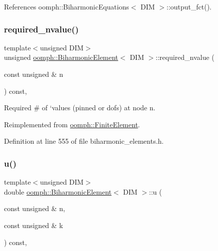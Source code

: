 References oomph\+::\+Biharmonic\+Equations$<$ D\+I\+M $>$\+::output\+\_\+fct().

\mbox{\label{classoomph_1_1BiharmonicElement_a11be94bc01db0e91409e5471693e8e0b}} 
\subsubsection{\texorpdfstring{required\+\_\+nvalue()}{required\_nvalue()}}
{\footnotesize\ttfamily template$<$unsigned D\+IM$>$ \\
unsigned \hyperlink{classoomph_1_1BiharmonicElement}{oomph\+::\+Biharmonic\+Element}$<$ D\+IM $>$\+::required\+\_\+nvalue (\begin{DoxyParamCaption}\item[{const unsigned \&}]{n }\end{DoxyParamCaption}) const\hspace{0.3cm}{\ttfamily [inline]}, {\ttfamily [virtual]}}



Required \# of `values\textquotesingle{} (pinned or dofs) at node n. 



Reimplemented from \hyperlink{classoomph_1_1FiniteElement_a56610c60d5bc2d7c27407a1455471b1a}{oomph\+::\+Finite\+Element}.



Definition at line 555 of file biharmonic\+\_\+elements.\+h.

\mbox{\label{classoomph_1_1BiharmonicElement_ada3127693270368783121dfbef92d35d}} 
\subsubsection{\texorpdfstring{u()}{u()}}
{\footnotesize\ttfamily template$<$unsigned D\+IM$>$ \\
double \hyperlink{classoomph_1_1BiharmonicElement}{oomph\+::\+Biharmonic\+Element}$<$ D\+IM $>$\+::u (\begin{DoxyParamCaption}\item[{const unsigned \&}]{n,  }\item[{const unsigned \&}]{k }\end{DoxyParamCaption}) const\hspace{0.3cm}{\ttfamily [inline]}, {\ttfamily [virtual]}}



